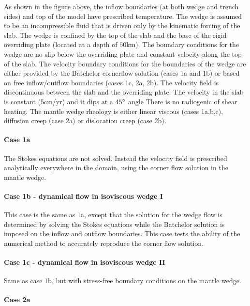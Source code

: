 As shown in the figure above, 
the inflow boundaries (at both wedge and trench sides) and top of the model 
have prescribed temperature. The wedge is assumed to be an incompressible fluid that
is driven only by the kinematic forcing of the slab. The wedge is
confined by the top of the slab and the base of the rigid overriding
plate (located at a depth of $50\text{km}$). 
The boundary conditions for the wedge are no-slip below the overriding plate and constant velocity
along the top of the slab. The velocity boundary conditions for the
boundaries of the wedge are either provided by the Batchelor cornerflow 
solution (cases 1a and 1b) or based on free inflow/outflow
boundaries (cases 1c, 2a, 2b). The velocity field is discontinuous between the slab
and the overriding plate.
The velocity in the slab is constant (5cm/yr) and it dips at a $45\degree$ angle
There is no radiogenic of shear heating.
The mantle wedge rheology is either linear viscous (cases 1a,b,c),
diffusion creep (case 2a) or dislocation creep (case 2b).





\paragraph{Case 1a} The Stokes equations are not solved. Instead the velocity field
is prescribed analytically everywhere in the domain, using the corner flow solution 
in the mantle wedge. 

\paragraph{Case 1b - dynamical flow in isoviscous wedge I}
This case is the same as 1a, except that the solution
for the wedge flow is determined by solving the Stokes equations while the Batchelor solution is
imposed on the inflow and outflow boundaries. This case tests the ability of the numerical method
to accurately reproduce the corner flow solution.

\paragraph{Case 1c - dynamical flow in isoviscous wedge II} 
Same as case 1b, but with stress-free boundary conditions on the mantle wedge.

\paragraph{Case 2a}


